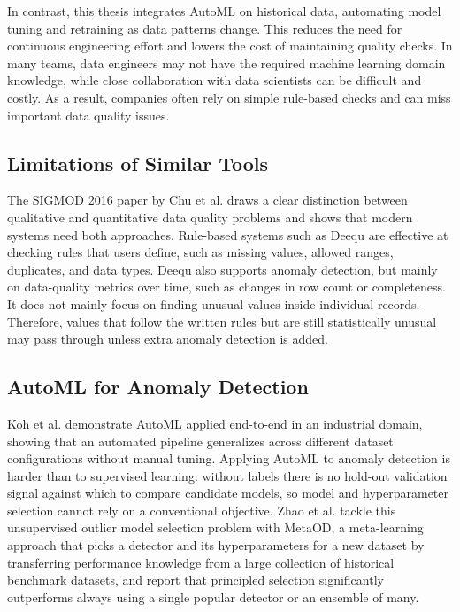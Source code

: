 \documentclass[12pt]{article}
\begin{document}
In contrast, this thesis integrates AutoML on historical data, automating model tuning and retraining as data patterns change. This reduces the need for continuous engineering effort and lowers the cost of maintaining quality checks. In many teams, data engineers may not have the required machine learning domain knowledge, while close collaboration with data scientists can be difficult and costly. As a result, companies often rely on simple rule-based checks and can miss important data quality issues.

\subsection{Limitations of Similar Tools}

The SIGMOD 2016 paper by Chu et al. \cite{chu2016datacleaning} draws a clear distinction between qualitative and quantitative data quality problems and shows that modern systems need both approaches. Rule-based systems such as Deequ \cite{schelter2018automating} are effective at checking rules that users define, such as missing values, allowed ranges, duplicates, and data types. Deequ also supports anomaly detection, but mainly on data-quality metrics over time, such as changes in row count or completeness. It does not mainly focus on finding unusual values inside individual records. Therefore, values that follow the written rules but are still statistically unusual may pass through unless extra anomaly detection is added.

\subsection{AutoML for Anomaly Detection}

Koh et al. \cite{KOH2022107886} demonstrate AutoML applied end-to-end in an industrial domain, showing that an automated pipeline generalizes across different dataset configurations without manual tuning. Applying AutoML to anomaly detection is harder than to supervised learning: without labels there is no hold-out validation signal against which to compare candidate models, so model and hyperparameter selection cannot rely on a conventional objective. Zhao et al. \cite{zhao2021metaod} tackle this unsupervised outlier model selection problem with MetaOD, a meta-learning approach that picks a detector and its hyperparameters for a new dataset by transferring performance knowledge from a large collection of historical benchmark datasets, and report that principled selection significantly outperforms always using a single popular detector or an ensemble of many.
\end{document}
